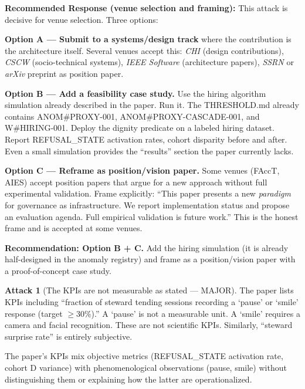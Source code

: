 \documentclass[12pt,a4paper]{article}
\theoremstyle{definition}
\newtheorem{attack}{Attack}[section]
\begin{document}
\begin{mdframed}[style=defenseframe]
\textbf{Recommended Response (venue selection and framing):}
This attack is decisive for venue selection. Three options:

\textbf{Option A — Submit to a systems/design track} where the contribution
is the architecture itself. Several venues accept this:
\emph{CHI} (design contributions), \emph{CSCW} (socio-technical systems),
\emph{IEEE Software} (architecture papers), \emph{SSRN} or \emph{arXiv}
preprint as position paper.

\textbf{Option B — Add a feasibility case study.} Use the hiring algorithm
simulation already described in the paper. Run it. The THRESHOLD.md already
contains ANOM\#PROXY-001, ANOM\#PROXY-CASCADE-001, and W\#HIRING-001. Deploy
the dignity predicate on a labeled hiring dataset. Report REFUSAL\_STATE
activation rates, cohort disparity before and after. Even a small simulation
provides the ``results'' section the paper currently lacks.

\textbf{Option C — Reframe as position/vision paper.} Some venues (FAccT,
AIES) accept position papers that argue for a new approach without full
experimental validation. Frame explicitly: ``This paper presents a new
\emph{paradigm} for governance as infrastructure. We report implementation
status and propose an evaluation agenda. Full empirical validation is future work.''
This is the honest frame and is accepted at some venues.

\textbf{Recommendation: Option B + C.} Add the hiring simulation (it is already
half-designed in the anomaly registry) and frame as a position/vision paper with
a proof-of-concept case study.
\end{mdframed}

\begin{attack}[The KPIs are not measurable as stated — MAJOR]
\label{att:kpis}
The paper lists KPIs including ``fraction of steward tending sessions recording
a `pause' or `smile' response (target $\geq 30\%$).'' A `pause' is not a
measurable unit. A `smile' requires a camera and facial recognition. These are
not scientific KPIs. Similarly, ``steward surprise rate'' is entirely subjective.

The paper's KPIs mix objective metrics (REFUSAL\_STATE activation rate, cohort
D variance) with phenomenological observations (pause, smile) without
distinguishing them or explaining how the latter are operationalized.
\end{attack}
\end{document}
